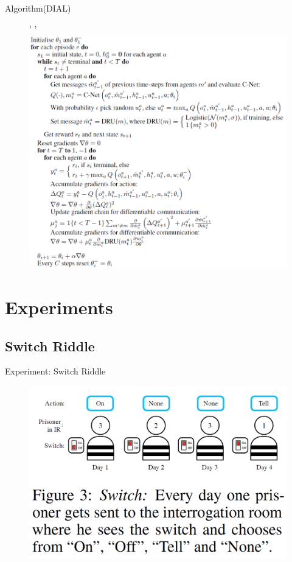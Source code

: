 \documentclass[mathserif]{beamer}
\begin{document}
\begin{frame}{Algorithm(DIAL)}
\begin{figure}'
  '
  \centering
  \includegraphics[scale=0.5]{fig/4}
\end{figure}
\end{frame}
\section{Experiments}
\subsection{Switch Riddle}
\begin{frame}{Experiment: Switch Riddle}
  \begin{figure}
    \centering
    \includegraphics[scale=0.5]{fig/5}
  \end{figure}
\end{frame}
\end{document}
